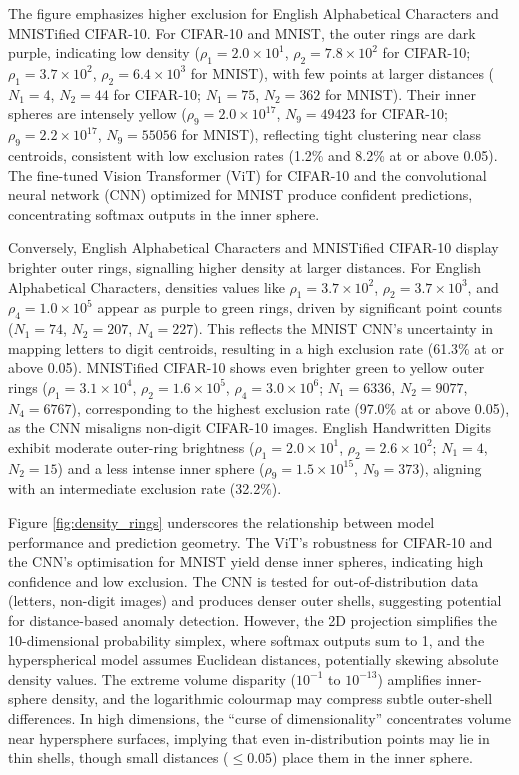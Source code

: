 The figure emphasizes higher exclusion for English Alphabetical Characters and MNISTified CIFAR-10. For CIFAR-10 and MNIST, the outer rings are dark purple, indicating low density (\(\rho_1 = 2.0 \times 10^1\), \(\rho_2 = 7.8 \times 10^2\) for CIFAR-10; \(\rho_1 = 3.7 \times 10^2\), \(\rho_2 = 6.4 \times 10^3\) for MNIST), with few points at larger distances (\(N_1 = 4\), \(N_2 = 44\) for CIFAR-10; \(N_1 = 75\), \(N_2 = 362\) for MNIST). Their inner spheres are intensely yellow (\(\rho_9 = 2.0 \times 10^{17}\), \(N_9 = 49423\) for CIFAR-10; \(\rho_9 = 2.2 \times 10^{17}\), \(N_9 = 55056\) for MNIST), reflecting tight clustering near class centroids, consistent with low exclusion rates (1.2\% and 8.2\% at or above 0.05). The fine-tuned Vision Transformer (ViT) for CIFAR-10 and the convolutional neural network (CNN) optimized for MNIST produce confident predictions, concentrating softmax outputs in the inner sphere.

Conversely, English Alphabetical Characters and MNISTified CIFAR-10 display brighter outer rings, signalling higher density at larger distances. For English Alphabetical Characters, densities values like \(\rho_1 = 3.7 \times 10^2\), \(\rho_2 = 3.7 \times 10^3\), and \(\rho_4 = 1.0 \times 10^5\) appear as purple to green rings, driven by significant point counts (\(N_1 = 74\), \(N_2 = 207\), \(N_4 = 227\)). This reflects the MNIST CNN’s uncertainty in mapping letters to digit centroids, resulting in a high exclusion rate (61.3\% at or above 0.05). MNISTified CIFAR-10 shows even brighter green to yellow outer rings (\(\rho_1 = 3.1 \times 10^4\), \(\rho_2 = 1.6 \times 10^5\), \(\rho_4 = 3.0 \times 10^6\); \(N_1 = 6336\), \(N_2 = 9077\), \(N_4 = 6767\)), corresponding to the highest exclusion rate (97.0\% at or above 0.05), as the CNN misaligns non-digit CIFAR-10 images. English Handwritten Digits exhibit moderate outer-ring brightness (\(\rho_1 = 2.0 \times 10^1\), \(\rho_2 = 2.6 \times 10^2\); \(N_1 = 4\), \(N_2 = 15\)) and a less intense inner sphere (\(\rho_9 = 1.5 \times 10^{15}\), \(N_9 = 373\)), aligning with an intermediate exclusion rate (32.2\%).

Figure \ref{fig:density_rings} underscores the relationship between model performance and prediction geometry. The ViT’s robustness for CIFAR-10 and the CNN’s optimisation for MNIST yield dense inner spheres, indicating high confidence and low exclusion. The CNN is tested for out-of-distribution data (letters, non-digit images) and produces denser outer shells, suggesting potential for distance-based anomaly detection. However, the 2D projection simplifies the 10-dimensional probability simplex, where softmax outputs sum to 1, and the hyperspherical model assumes Euclidean distances, potentially skewing absolute density values. The extreme volume disparity (\(10^{-1}\) to \(10^{-13}\)) amplifies inner-sphere density, and the logarithmic colourmap may compress subtle outer-shell differences. In high dimensions, the ``curse of dimensionality'' concentrates volume near hypersphere surfaces, implying that even in-distribution points may lie in thin shells, though small distances (\(\leq 0.05\)) place them in the inner sphere.

